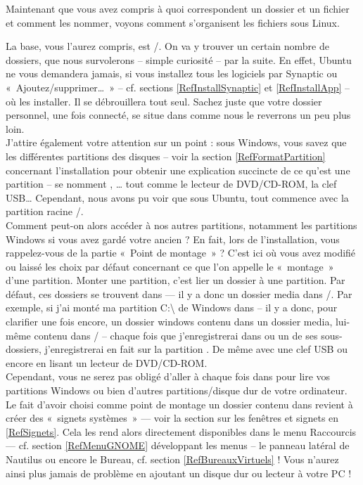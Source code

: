 Maintenant que vous avez compris à quoi correspondent un dossier et un fichier et comment les nommer, voyons comment s'organisent les fichiers sous Linux.\par
La base, vous l'aurez compris, est /. On va y trouver un certain nombre de dossiers, que nous survolerons -- simple curiosité -- par la suite. En effet, Ubuntu ne vous demandera jamais, si vous installez tous les logiciels par Synaptic ou «~Ajoutez/supprimer\ldots{}~» -- cf. sections \ref{RefInstallSynaptic} et \ref{RefInstallApp} -- où les installer. Il se débrouillera tout seul. Sachez juste que votre dossier personnel, une fois connecté, se situe dans  comme nous le reverrons un peu plus loin.\\
J'attire également votre attention sur un point : sous Windows, vous savez que les différentes partitions des disques -- voir la section \ref{RefFormatPartition} concernant l'installation pour obtenir une explication succincte de ce qu'est une partition -- se nomment , \ldots{} tout comme le lecteur de DVD/CD-ROM, la clef USB\ldots{} Cependant, nous avons pu voir que sous Ubuntu, tout commence avec la partition racine /.\\
Comment peut-on alors accéder à nos autres partitions, notamment les partitions Windows si vous avez gardé votre ancien  ? En fait, lors de l'installation, vous rappelez-vous de la partie «~Point de montage~» ? C'est ici où vous avez modifié ou laissé les choix par défaut concernant ce que l'on appelle le «~montage~» d'une partition. Monter une partition, c'est lier un dossier à une partition. Par défaut, ces dossiers se trouvent dans  --- il y a donc un dossier media dans /. Par exemple, si j'ai monté ma partition C:\textbackslash{} de Windows dans  -- il y a donc, pour clarifier une fois encore, un dossier windows contenu dans un dossier media, lui-même contenu dans / -- chaque fois que j'enregistrerai dans  ou un de ses sous-dossiers, j'enregistrerai en fait sur la partition . De même avec une clef USB ou encore en lisant un lecteur de DVD/CD-ROM.\\
Cependant, vous ne serez pas obligé d'aller à chaque fois dans  pour lire vos partitions Windows ou bien d'autres partitions/disque dur de votre ordinateur. Le fait d'avoir choisi comme point de montage un dossier contenu dans  revient à créer des «~signets systèmes~» --- voir la section sur les fenêtres et signets en \ref{RefSignets}. Cela les rend alors directement disponibles dans le menu Raccourcis --- cf. section \ref{RefMenuGNOME} développant les menus -- le panneau latéral de Nautilus ou encore le Bureau, cf. section \ref{RefBureauxVirtuels} ! Vous n'aurez ainsi plus jamais de problème en ajoutant un disque dur ou lecteur à votre PC !\par
